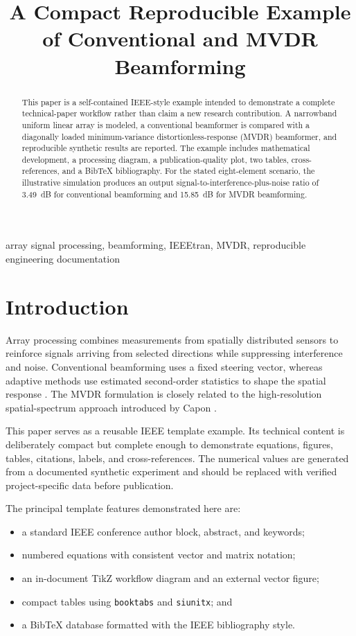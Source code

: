 \documentclass[conference]{IEEEtran}
\title{A Compact Reproducible Example of Conventional and MVDR Beamforming}
\author{%
\IEEEauthorblockN{Hossein Molhem}
\IEEEauthorblockA{Department of Electrical and Computer Engineering\\
Kennesaw State University\\
Marietta, Georgia, USA\\
email@example.com}
}
\begin{document}
\maketitle

\begin{abstract}
This paper is a self-contained IEEE-style example intended to demonstrate a complete technical-paper workflow rather than claim a new research contribution. A narrowband uniform linear array is modeled, a conventional beamformer is compared with a diagonally loaded minimum-variance distortionless-response (MVDR) beamformer, and reproducible synthetic results are reported. The example includes mathematical development, a processing diagram, a publication-quality plot, two tables, cross-references, and a BibTeX bibliography. For the stated eight-element scenario, the illustrative simulation produces an output signal-to-interference-plus-noise ratio of \SI{3.49}{dB} for conventional beamforming and \SI{15.85}{dB} for MVDR beamforming.
\end{abstract}

\begin{IEEEkeywords}
array signal processing, beamforming, IEEEtran, MVDR, reproducible engineering documentation
\end{IEEEkeywords}

\section{Introduction}
Array processing combines measurements from spatially distributed sensors to reinforce signals arriving from selected directions while suppressing interference and noise. Conventional beamforming uses a fixed steering vector, whereas adaptive methods use estimated second-order statistics to shape the spatial response \cite{vanveen1988,vt2002}. The MVDR formulation is closely related to the high-resolution spatial-spectrum approach introduced by Capon \cite{capon1969}.

This paper serves as a reusable IEEE template example. Its technical content is deliberately compact but complete enough to demonstrate equations, figures, tables, citations, labels, and cross-references. The numerical values are generated from a documented synthetic experiment and should be replaced with verified project-specific data before publication.

The principal template features demonstrated here are:
\begin{itemize}
    \item a standard IEEE conference author block, abstract, and keywords;
    \item numbered equations with consistent vector and matrix notation;
    \item an in-document TikZ workflow diagram and an external vector figure;
    \item compact tables using \texttt{booktabs} and \texttt{siunitx}; and
    \item a BibTeX database formatted with the IEEE bibliography style.
\end{itemize}
\end{document}
